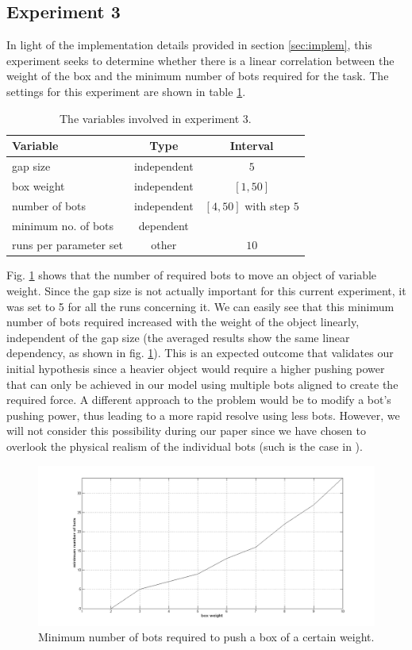 \subsection{Experiment 3}
\label{ssec:exp3}

In light of the implementation details provided in section \ref{sec:implem}, this experiment seeks to determine whether there is a linear correlation between the weight of the box and the minimum number of bots required for the task. The settings for this experiment are shown in table \ref{tbl:exp3}.

\begin{table}
 \caption{The variables involved in experiment 3.}
 \begin{center}
  \begin{tabular}{| p{5cm} | c | c |}
   \hline
   \centering \textbf{Variable} & \textbf{Type} & \textbf{Interval} \\ \hline
   gap size & independent & $5$ \\ \hline
   box weight & independent & $[1, 50]$ \\ \hline
   number of bots & independent & $[4, 50]$ with step $5$ \\ \hline
   minimum no. of bots & dependent &  \\ \hline
   runs per parameter set & other & $10$ \\ \hline
  \end{tabular}
 \end{center}
 \label{tbl:exp3}
\end{table}

Fig. \ref{fig:minbots} shows that the number of required bots to move an object of variable weight. Since the gap size is not actually important for this current experiment, it was set to 5 for all the runs concerning it. We can easily see that this minimum number of bots required increased with the weight of the object linearly, independent of the gap size (the averaged results show the same linear dependency, as shown in fig. \ref{fig:minbots}). This is an expected outcome that validates our initial hypothesis since a heavier object would require a higher pushing power that can only be achieved in our model using multiple bots aligned to create the required force. A different approach to the problem would be to modify a bot's pushing power, thus leading to a more rapid resolve using less bots. However, we will not consider this possibility during our paper since we have chosen to overlook the physical realism of the individual bots (such is the case in \cite{Yun:2011:OSA:2036628.2036638}).

\begin{figure}[t]
\centerline{\includegraphics[scale=0.4]{images/minimum_no_bots2}}
\caption{Minimum number of bots required to push a box of a certain weight.}
\label{fig:minbots}
\end{figure}
